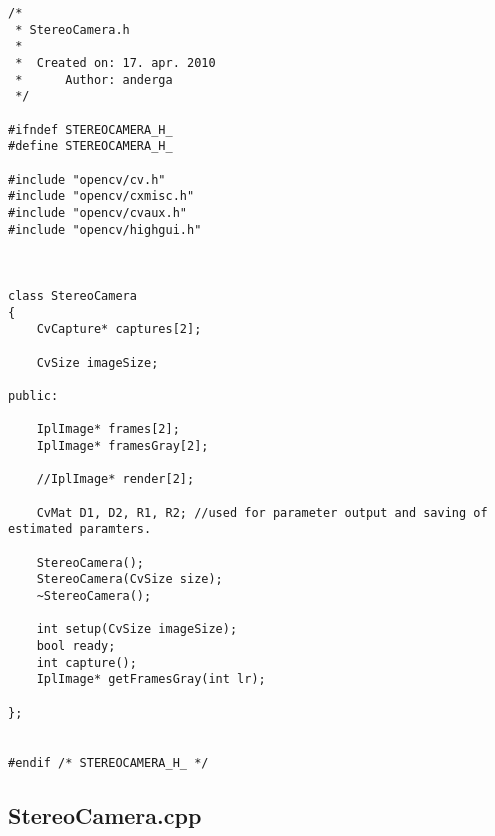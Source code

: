 \begin{lstlisting}
/*
 * StereoCamera.h
 *
 *  Created on: 17. apr. 2010
 *      Author: anderga
 */

#ifndef STEREOCAMERA_H_
#define STEREOCAMERA_H_

#include "opencv/cv.h"
#include "opencv/cxmisc.h"
#include "opencv/cvaux.h"
#include "opencv/highgui.h"



class StereoCamera
{
    CvCapture* captures[2];

    CvSize imageSize;

public:

    IplImage* frames[2];
    IplImage* framesGray[2];

    //IplImage* render[2];

    CvMat D1, D2, R1, R2; //used for parameter output and saving of estimated paramters.

    StereoCamera();
    StereoCamera(CvSize size);
    ~StereoCamera();

    int setup(CvSize imageSize);
    bool ready;
    int capture();
    IplImage* getFramesGray(int lr);

};


#endif /* STEREOCAMERA_H_ */

\end{lstlisting}


\subsection{StereoCamera.cpp}

